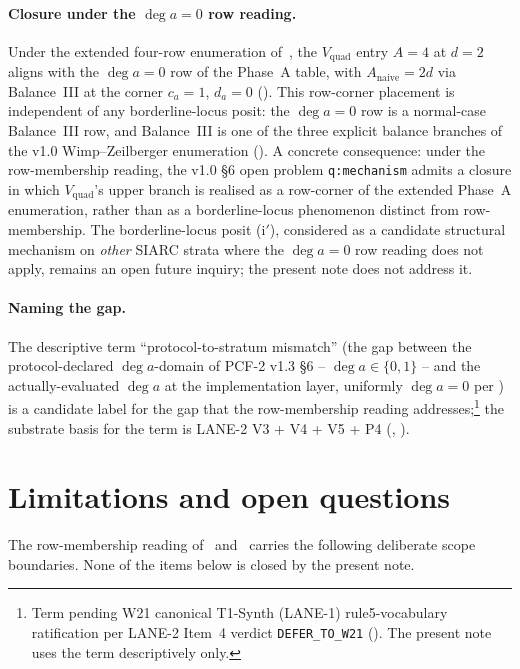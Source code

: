 \documentclass[11pt,reqno]{amsart}
\theoremstyle{plain}
\theoremstyle{definition}
\theoremstyle{remark}
\newcommand{\dega}{\deg a}
\newcommand{\Vquad}{V_{\mathrm{quad}}}
\begin{document}
\paragraph{Closure under the $\dega = 0$ row reading.}
Under the extended four-row enumeration
of~, the $\Vquad$ entry $A = 4$ at $d = 2$
aligns with the $\dega = 0$ row of the Phase~A table, with
$A_{\mathrm{naive}} = 2d$ via Balance~III at the corner
$c_a = 1$, $d_a = 0$ (). This
row-corner placement is independent of any borderline-locus
posit: the $\dega = 0$ row is a normal-case Balance~III row,
and Balance~III is one of the three explicit balance branches
of the v1.0 Wimp--Zeilberger enumeration
(\cite[\S 3.2]{bt_baseline_note_v10}).
A concrete consequence: under the row-membership reading, the
v1.0 \S 6 open problem \texttt{q:mechanism} admits a closure
in which $\Vquad$'s upper branch is realised as a row-corner
of the extended Phase~A enumeration, rather than as a
borderline-locus phenomenon distinct from row-membership. The
borderline-locus posit \textup{(i$'$)}, considered as a
candidate structural mechanism on \emph{other} SIARC strata
where the $\dega = 0$ row reading does not apply, remains an
open future inquiry; the present note does not address it.

\paragraph{Naming the gap.}
The descriptive term ``protocol-to-stratum mismatch'' (the gap
between the protocol-declared $\dega$-domain of PCF-2 v1.3
\S 6 -- $\dega \in \{0, 1\}$ -- and the actually-evaluated
$\dega$ at the implementation layer, uniformly $\dega = 0$ per
) is a candidate label for the gap
that the row-membership reading addresses;\footnote{Term
pending W21 canonical T1-Synth (LANE-1) rule5-vocabulary
ratification per LANE-2 Item~4 verdict
\texttt{DEFER\_TO\_W21}
(\cite[Item~4, L210--213]{lane2_six_item_verdict}). The
present note uses the term descriptively only.} the substrate
basis for the term is LANE-2 V3 + V4 + V5 + P4
(\cite[\S V3 -- \S V5]{lane2_independent_substrate_verification},
\cite[\S P4]{lane2_independent_depth_probe}).

\section{Limitations and open questions}
\label{sec:limitations}

The row-membership reading of~ and~%
 carries the following deliberate scope
boundaries. None of the items below is closed by the present
note.
\end{document}
